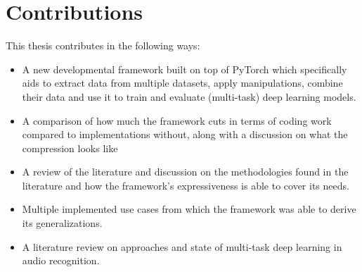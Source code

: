 
\section{Contributions}

This thesis contributes in the following ways:

\begin{itemize}
	\item A new developmental framework built on top of PyTorch which specifically aids to extract data from multiple datasets, apply manipulations, combine their data and use it to train and evaluate (multi-task) deep learning models.
	\item A comparison of how much the framework cuts in terms of coding work compared to implementations without, along with a discussion on what the compression looks like
	\item A review of the literature and discussion on the methodologies found in the literature and how the framework's expressiveness is able to cover its needs.
	\item Multiple implemented use cases from which the framework was able to derive its generalizations.
	\item A literature review on approaches and state of multi-task deep learning in audio recognition.
\end{itemize}

